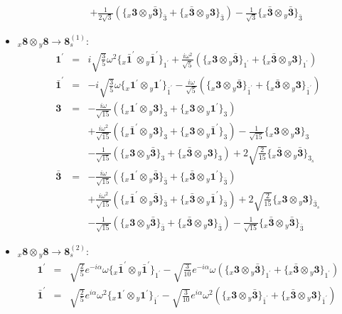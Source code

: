 \documentclass[english]{article}
\newcommand{\rep}[1]{\mathbf{#1}}
\newcommand{\repx}[2]{{}_{#2}\mathbf{#1}}
\newcommand{\subcg}[3]{\big\{ \repx{#1}{x}\otimes\repx{#2}{y}\big\}^{}_{#3}}
\begin{document}
\begin{itemize}
\begin{eqnarray*}
 & & +\frac{1}{2 \sqrt{3}}\left(\subcg{3}{\bar{3}}{\bar{3}}+\subcg{\bar{3}}{3}{\bar{3}}\right)-\frac{1}{\sqrt{3}}\subcg{\bar{3}}{\bar{3}}{\bar{3}}
\end{eqnarray*}
\item $\repx{8}{x}\otimes\repx{8}{y}\to\rep{8}_{s}^{(1)}$:
\begin{eqnarray*}
\rep{1^{\prime}} &=& i \sqrt{\frac{3}{5}} \omega ^2\subcg{\bar{1}^{\prime}}{\bar{1}^{\prime}}{1^{\prime}}+\frac{i \omega ^2}{\sqrt{5}}\left(\subcg{3}{\bar{3}}{1^{\prime}}+\subcg{\bar{3}}{3}{1^{\prime}}\right)
\\
\rep{\bar{1}^{\prime}} &=& -i \sqrt{\frac{3}{5}} \omega\subcg{1^{\prime}}{1^{\prime}}{\bar{1}^{\prime}}-\frac{i \omega }{\sqrt{5}}\left(\subcg{3}{\bar{3}}{\bar{1}^{\prime}}+\subcg{\bar{3}}{3}{\bar{1}^{\prime}}\right)
\\
\rep{3} &=& -\frac{i \omega }{\sqrt{15}}\left(\subcg{1^{\prime}}{3}{3}+\subcg{3}{1^{\prime}}{3}\right) \\ 
 & & +\frac{i \omega ^2}{\sqrt{15}}\left(\subcg{\bar{1}^{\prime}}{3}{3}+\subcg{3}{\bar{1}^{\prime}}{3}\right)-\frac{1}{\sqrt{15}}\subcg{3}{3}{3} \\ 
 & & -\frac{1}{\sqrt{15}}\left(\subcg{3}{\bar{3}}{3}+\subcg{\bar{3}}{3}{3}\right)+2 \sqrt{\frac{2}{15}}\subcg{\bar{3}}{\bar{3}}{3_{s}}
\\
\rep{\bar{3}} &=& -\frac{i \omega }{\sqrt{15}}\left(\subcg{1^{\prime}}{\bar{3}}{\bar{3}}+\subcg{\bar{3}}{1^{\prime}}{\bar{3}}\right) \\ 
 & & +\frac{i \omega ^2}{\sqrt{15}}\left(\subcg{\bar{1}^{\prime}}{\bar{3}}{\bar{3}}+\subcg{\bar{3}}{\bar{1}^{\prime}}{\bar{3}}\right)+2 \sqrt{\frac{2}{15}}\subcg{3}{3}{\bar{3}_{s}} \\ 
 & & -\frac{1}{\sqrt{15}}\left(\subcg{3}{\bar{3}}{\bar{3}}+\subcg{\bar{3}}{3}{\bar{3}}\right)-\frac{1}{\sqrt{15}}\subcg{\bar{3}}{\bar{3}}{\bar{3}}
\end{eqnarray*}
\item $\repx{8}{x}\otimes\repx{8}{y}\to\rep{8}_{s}^{(2)}$:
\begin{eqnarray*}
\rep{1^{\prime}} &=& \sqrt{\frac{2}{5}} e^{-i \alpha } \omega\subcg{\bar{1}^{\prime}}{\bar{1}^{\prime}}{1^{\prime}}-\sqrt{\frac{3}{10}} e^{-i \alpha } \omega\left(\subcg{3}{\bar{3}}{1^{\prime}}+\subcg{\bar{3}}{3}{1^{\prime}}\right)
\\
\rep{\bar{1}^{\prime}} &=& \sqrt{\frac{2}{5}} e^{i \alpha } \omega ^2\subcg{1^{\prime}}{1^{\prime}}{\bar{1}^{\prime}}-\sqrt{\frac{3}{10}} e^{i \alpha } \omega ^2\left(\subcg{3}{\bar{3}}{\bar{1}^{\prime}}+\subcg{\bar{3}}{3}{\bar{1}^{\prime}}\right)

\end{eqnarray*}
\end{itemize}
\end{document}
